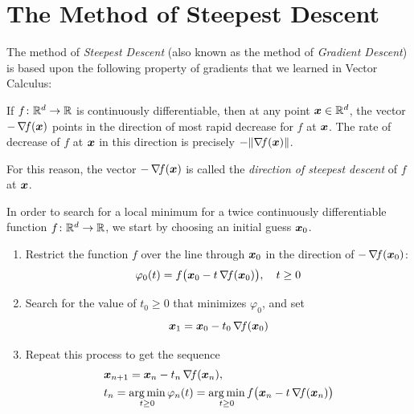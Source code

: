 
\section{The Method of Steepest Descent}

The method of \emph{Steepest Descent} (also known as the method of \emph{Gradient Descent}) is based upon the following property of gradients that we learned in Vector Calculus:

\begin{theorem}
If $f \colon \mathbb{R}^d \to \mathbb{R}$ is continuously differentiable, then at any point $\boldsymbol{x} \in \mathbb{R}^d$, the vector $-\mathop{\nabla\! {f}}(\boldsymbol{x})$ points in the direction of most rapid decrease for $f$ at $\boldsymbol{x}$.  The rate of decrease of $f$ at $\boldsymbol{x}$ in this direction is precisely $-\lVert \mathop{\nabla\! {f}}(\boldsymbol{x}) \rVert$.
\end{theorem}

\begin{remark}
For this reason, the vector $-\mathop{\nabla\! {f}}(\boldsymbol{x})$ is called the \emph{direction of steepest descent} of $f$ at $\boldsymbol{x}$.
\end{remark}

\separator

In order to search for a local minimum for a twice continuously differentiable function $f\colon \mathbb{R}^d \to \mathbb{R}$, we start by choosing an initial guess $\boldsymbol{x}_0$.  
\begin{enumerate}
	\item Restrict the function $f$ over the line through $\boldsymbol{x}_0$ in the direction of $-\mathop{\nabla\! {f}}(\boldsymbol{x}_0)$:
	\begin{equation*}
	\varphi_0(t) = f\big( \boldsymbol{x}_0 - t \mathop{\nabla\! {f}}(\boldsymbol{x}_0) \big), \quad t\geq 0
	\end{equation*}
	\item Search for the value of $t_0 \geq 0$ that minimizes $\varphi_0$, and set 
	\begin{equation*}
	\boldsymbol{x}_1 = \boldsymbol{x}_0 - t_0\mathop{\nabla\! {f}}(\boldsymbol{x}_0)
	\end{equation*}
	\item Repeat this process to get the sequence
	\begin{gather}\label{equation:SteepestDescent}
	\begin{split}
	&\boldsymbol{x}_{n+1} = \boldsymbol{x}_n - t_n \mathop{\nabla\! {f}}(\boldsymbol{x}_n), \\ &t_n = \operatorname*{arg\,min}_{t\geq 0} \varphi_n(t) = \operatorname*{arg\,min}_{t\geq 0} f\big(\boldsymbol{x}_n - t\mathop{\nabla\! {f}}(\boldsymbol{x}_n)\big)
	\end{split}
	\end{gather}
\end{enumerate}


